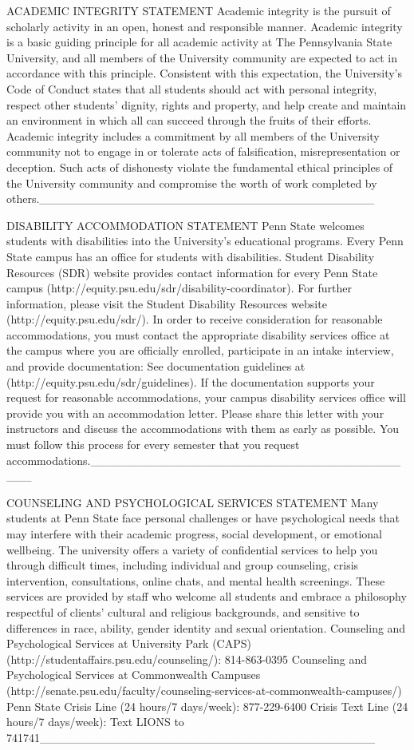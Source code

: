 \vspace{-.1in}\documentclass[11pt]{article}
\begin{document}
ACADEMIC INTEGRITY STATEMENT
Academic integrity is the pursuit of scholarly activity in an open, honest and responsible manner. Academic integrity is a basic guiding principle for all academic activity at The Pennsylvania State University, and all members of the University community are expected to act in accordance with this principle. Consistent with this expectation, the University’s Code of Conduct states that all students should act with personal integrity, respect other students’ dignity, rights and property, and help create and maintain an environment in which all can succeed through the fruits of their efforts.
Academic integrity includes a commitment by all members of the University community not to engage in or tolerate acts of falsification, misrepresentation or deception. Such acts of dishonesty violate the fundamental ethical principles of the University community and compromise the worth of work completed by others.________________________________________

DISABILITY ACCOMMODATION STATEMENT
Penn State welcomes students with disabilities into the University’s educational programs. Every Penn State campus has an office for students with disabilities. Student Disability Resources (SDR) website provides contact information for every Penn State campus (http://equity.psu.edu/sdr/disability-coordinator). For further information, please visit the Student Disability Resources website (http://equity.psu.edu/sdr/).
In order to receive consideration for reasonable accommodations, you must contact the appropriate disability services office at the campus where you are officially enrolled, participate in an intake interview, and provide documentation: See documentation guidelines at (http://equity.psu.edu/sdr/guidelines). If the documentation supports your request for reasonable accommodations, your campus disability services office will provide you with an accommodation letter. Please share this letter with your instructors and discuss the accommodations with them as early as possible. You must follow this process for every semester that you request accommodations.________________________________________

COUNSELING AND PSYCHOLOGICAL SERVICES STATEMENT
Many students at Penn State face personal challenges or have psychological needs that may interfere with their academic progress, social development, or emotional wellbeing. The university offers a variety of confidential services to help you through difficult times, including individual and group counseling, crisis intervention, consultations, online chats, and mental health screenings. These services are provided by staff who welcome all students and embrace a philosophy respectful of clients’ cultural and religious backgrounds, and sensitive to differences in race, ability, gender identity and sexual orientation.
Counseling and Psychological Services at University Park  (CAPS)
(http://studentaffairs.psu.edu/counseling/): 814-863-0395
Counseling and Psychological Services at Commonwealth Campuses
(http://senate.psu.edu/faculty/counseling-services-at-commonwealth-campuses/)
Penn State Crisis Line (24 hours/7 days/week): 877-229-6400
Crisis Text Line (24 hours/7 days/week): Text LIONS to 741741________________________________________
\end{document}
